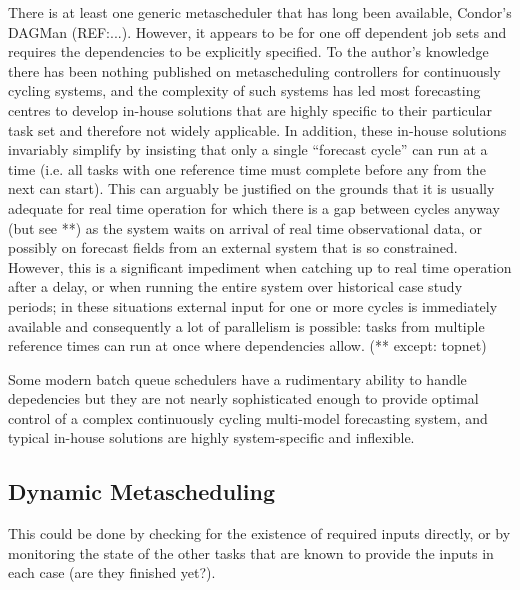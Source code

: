 \documentclass[11pt,a4paper]{article}
\begin{document}
There is at least one generic metascheduler that has long been
available, Condor's DAGMan (REF:...). However, it appears to be for one
off dependent job sets and requires the dependencies to be explicitly
specified.  To the author's knowledge there has been nothing published
on metascheduling controllers for continuously cycling systems, and the
complexity of such systems has led most forecasting centres to develop
in-house solutions that are highly specific to their particular task set
and therefore not widely applicable. In addition, these in-house
solutions invariably simplify by insisting that only a single ``forecast
cycle'' can run at a time (i.e. all tasks with one reference time must
complete before any from the next can start). This can arguably be
justified on the grounds that it is usually adequate for real time
operation for which there is a gap between cycles anyway (but see **) as
the system waits on arrival of real time observational data, or possibly
on forecast fields from an external system that is so constrained.
However, this is a significant impediment when catching up to real time
operation after a delay, or when running the entire system over
historical case study periods; in these situations external input for
one or more cycles is immediately available and consequently a lot of
parallelism is possible: tasks from multiple reference times can run at
once where dependencies allow.  (** except: topnet)

Some modern batch queue schedulers have a rudimentary ability to handle
depedencies but they are not nearly sophisticated enough to provide
optimal control of a complex continuously cycling multi-model
forecasting system, and typical in-house solutions are highly
system-specific and inflexible. 


\subsection{Dynamic Metascheduling}

This could be done by checking for the existence of required inputs
directly, or by monitoring the state of the other tasks that are known
to provide the inputs in each case (are they finished yet?).  
\end{document}
